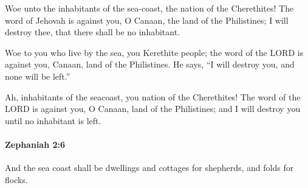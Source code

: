 			\begin{versebox}
					\item[BHS] 
					\item[LXX] 
					\item[ASV] Woe unto the inhabitants of the sea-coast, the nation of the Cherethites! The word of Jehovah is against you, O Canaan, the land of the Philistines; I will destroy thee, that there shall be no inhabitant.
					\item[NIV] Woe to you who live by the sea, you Kerethite people; the word of the LORD is against you, Canaan, land of the Philistines. He says, “I will destroy you, and none will be left.”
					\item[NRSV] Ah, inhabitants of the seacoast, you nation of the Cherethites! The word of the LORD is against you, O Canaan, land of the Philistines; and I will destroy you until no inhabitant is left.
			\end{versebox}

		\paragraph{Zephaniah 2:6} %
			\label{ZEPHANIAH-2-6}

			And the sea coast shall be dwellings and cottages for shepherds, and folds for flocks.

